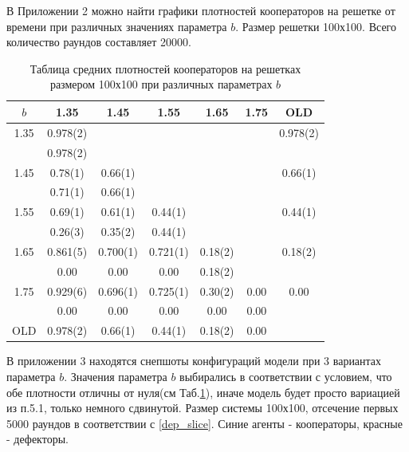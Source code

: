 \documentclass[a4paper]{article}
\begin{document}
	
	В Приложении 2 можно найти графики плотностей кооператоров на решетке от времени при различных значениях параметра $b$. Размер решетки 100х100. Всего количество раундов составляет 20000.
	
	\begin{table}
			\centering
		\begin{tabular}{|c|c|c|c|c|c|c|}
			\hline 
			$b$ & 1.35 & 1.45 & 1.55 & 1.65 & 1.75 & OLD \\ 
			\hline 
			1.35 & 0.978(2) &  &  &  &  & 0.978(2) \\ 
			& 0.978(2) &  &  &  &  &  \\ 
			\hline 
			1.45 & 0.78(1) & 0.66(1) &  &  &  & 0.66(1) \\
			& 0.71(1) & 0.66(1) &  &  &  &  \\ 
			\hline 
			1.55 & 0.69(1) & 0.61(1) & 0.44(1) &  &  & 0.44(1) \\
			& 0.26(3) & 0.35(2) & 0.44(1) &  &  &  \\  
			\hline 
			1.65 & 0.861(5) & 0.700(1) & 0.721(1) & 0.18(2)	 &  & 0.18(2)	 \\
			& 0.00  & 0.00 & 0.00 & 0.18(2) &  &  \\  
			\hline 
			1.75 & 0.929(6) & 0.696(1) & 0.725(1) & 0.30(2)  & 0.00 & 0.00 \\
			& 0.00 & 0.00 & 0.00 & 0.00 & 0.00 &  \\ 
			\hline 
			OLD & 0.978(2) & 0.66(1) & 0.44(1) & 0.18(2) & 0.00 &  \\ 
			\hline 
		\end{tabular}
		\caption{Таблица средних плотностей кооператоров на решетках размером 100х100 при различных параметрах $b$}
		\label{dep_freq} 
	\end{table}
	
	\par В приложении 3 находятся снепшоты конфигураций модели при 3 вариантах параметра $b$. Значения параметра $b$ выбирались в соответствии с условием, что обе плотности отличны от нуля(см Таб.\ref{dep_freq}), иначе модель будет просто вариацией из п.5.1, только немного сдвинутой. Размер системы 100х100, отсечение первых 5000 раундов в соответствии с \ref{dep_slice}. Синие агенты - кооператоры, красные - дефекторы.
		
\end{document}
